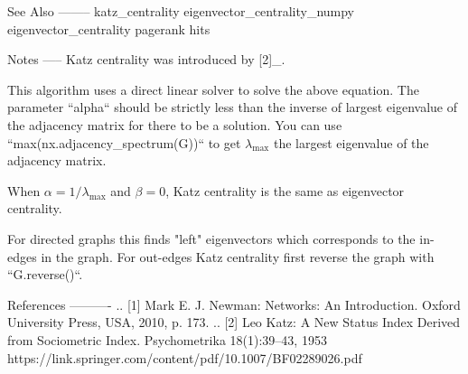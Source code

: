 \begin{DoxyVerb}
See Also
--------
katz_centrality
eigenvector_centrality_numpy
eigenvector_centrality
pagerank
hits

Notes
-----
Katz centrality was introduced by [2]_.

This algorithm uses a direct linear solver to solve the above equation.
The parameter ``alpha`` should be strictly less than the inverse of largest
eigenvalue of the adjacency matrix for there to be a solution.
You can use ``max(nx.adjacency_spectrum(G))`` to get $\lambda_{\max}$ the largest
eigenvalue of the adjacency matrix.

When $\alpha = 1/\lambda_{\max}$ and $\beta=0$, Katz centrality is the same
as eigenvector centrality.

For directed graphs this finds "left" eigenvectors which corresponds
to the in-edges in the graph. For out-edges Katz centrality
first reverse the graph with ``G.reverse()``.

References
----------
.. [1] Mark E. J. Newman:
   Networks: An Introduction.
   Oxford University Press, USA, 2010, p. 173.
.. [2] Leo Katz:
   A New Status Index Derived from Sociometric Index.
   Psychometrika 18(1):39–43, 1953
   https://link.springer.com/content/pdf/10.1007/BF02289026.pdf
\end{DoxyVerb}
 